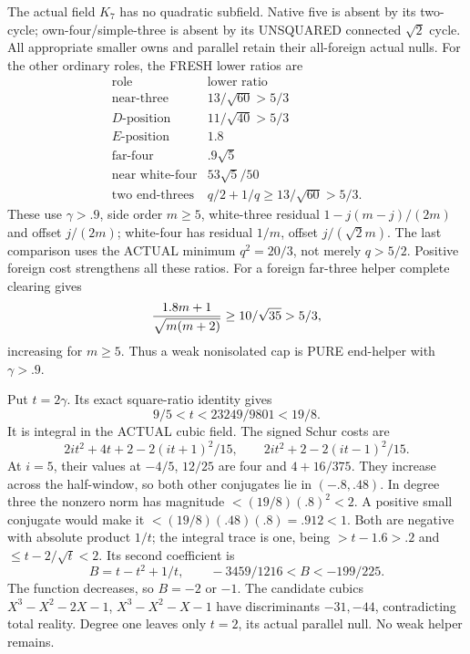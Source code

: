 \documentclass[11pt]{article}
\begin{document}
The actual field \(K_7\) has no quadratic
subfield.  Native five is absent by its
two-cycle; own-four/simple-three is absent
by its UNSQUARED connected \(\sqrt2\) cycle.
All appropriate smaller owns and parallel
retain their all-foreign actual nulls.
For the other ordinary roles, the FRESH
lower ratios are
\[
 \begin{array}{c|c}
 \text{role}&\text{lower ratio}\\ \hline
 \text{near-three}&13/\sqrt{60}>5/3\\
 D\text{-position}&11/\sqrt{40}>5/3\\
 E\text{-position}&1.8\\
 \text{far-four}&.9\sqrt5\\
 \text{near white-four}&53\sqrt5/50\\
 \text{two end-threes}&q/2+1/q\ge13/\sqrt{60}>5/3 .
 \end{array}
\]
These use \(\gamma>.9\), side order
\(m\ge5\), white-three residual
\(1-j(m-j)/(2m)\) and offset \(j/(2m)\);
white-four has residual \(1/m\), offset
\(j/(\sqrt2m)\).
The last comparison uses the ACTUAL minimum
\(q^2=20/3\), not merely \(q>5/2\).
Positive foreign cost strengthens all
these ratios.
For a foreign far-three helper complete
clearing gives
\[
        {1.8m+1\over\sqrt{m(m+2)}}\ge10/\sqrt{35}>5/3 ,
\]
increasing for \(m\ge5\).
Thus a weak nonisolated cap is PURE
end-helper with \(\gamma>.9\).

Put \(t=2\gamma\).
Its exact square-ratio identity gives
\[
                      9/5<t<23249/9801<19/8 .
\]
It is integral in the ACTUAL cubic field.
The signed Schur costs are
\[
 2it^2+4t+2-2(it+1)^2/15,\qquad
 2it^2+2-2(it-1)^2/15 .
\]
At \(i=5\), their values at \(-4/5\),
\(12/25\) are four and \(4+16/375\).
They increase across the half-window,
so both other conjugates lie in
\((-.8,.48)\).
In degree three the nonzero norm has
magnitude \(<(19/8)(.8)^2<2\).
A positive small conjugate would make it
\(<(19/8)(.48)(.8)=.912<1\).
Both are negative with absolute product
\(1/t\); the integral trace is one,
being \(>t-1.6>.2\) and
\(\le t-2/\sqrt t<2\).
Its second coefficient is
\[
 B=t-t^2+1/t,\qquad
                    -3459/1216<B<-199/225 .
\]
The function decreases, so \(B=-2\) or
\(-1\).
The candidate cubics
\(X^3-X^2-2X-1\), \(X^3-X^2-X-1\)
have discriminants \(-31,-44\), contradicting
total reality.
Degree one leaves only \(t=2\), its
actual parallel null.
No weak helper remains.
\end{document}
